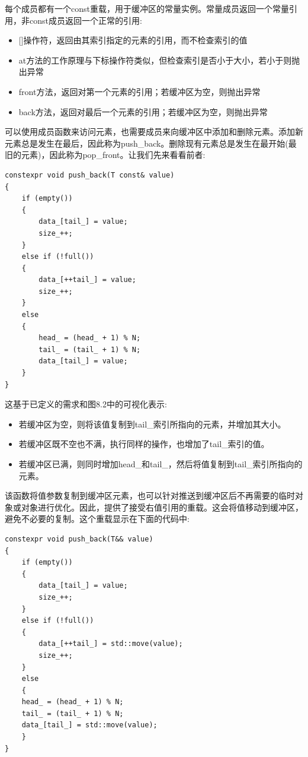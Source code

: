 每个成员都有一个const重载，用于缓冲区的常量实例。常量成员返回一个常量引用，非const成员返回一个正常的引用:

\begin{itemize}
\item
{}[]操作符，返回由其索引指定的元素的引用，而不检查索引的值

\item
at方法的工作原理与下标操作符类似，但检查索引是否小于大小，若小于则抛出异常

\item
front方法，返回对第一个元素的引用；若缓冲区为空，则抛出异常

\item
back方法，返回对最后一个元素的引用；若缓冲区为空，则抛出异常
\end{itemize}

可以使用成员函数来访问元素，也需要成员来向缓冲区中添加和删除元素。添加新元素总是发生在最后，因此称为push\_back。删除现有元素总是发生在最开始(最旧的元素)，因此称为pop\_front。让我们先来看看前者:

\begin{lstlisting}[style=styleCXX]
constexpr void push_back(T const& value)
{
	if (empty())
	{
		data_[tail_] = value;
		size_++;
	}
	else if (!full())
	{
		data_[++tail_] = value;
		size_++;
	}
	else
	{
		head_ = (head_ + 1) % N;
		tail_ = (tail_ + 1) % N;
		data_[tail_] = value;
	}
}
\end{lstlisting}

这基于已定义的需求和图8.2中的可视化表示:

\begin{itemize}
\item
若缓冲区为空，则将该值复制到tail\_索引所指向的元素，并增加其大小。

\item
若缓冲区既不空也不满，执行同样的操作，也增加了tail\_索引的值。

\item
若缓冲区已满，则同时增加head\_和tail\_，然后将值复制到tail\_索引所指向的元素。
\end{itemize}

该函数将值参数复制到缓冲区元素，也可以针对推送到缓冲区后不再需要的临时对象或对象进行优化。因此，提供了接受右值引用的重载。这会将值移动到缓冲区，避免不必要的复制。这个重载显示在下面的代码中:

\begin{lstlisting}[style=styleCXX]
constexpr void push_back(T&& value)
{
	if (empty())
	{
		data_[tail_] = value;
		size_++;
	}
	else if (!full())
	{
		data_[++tail_] = std::move(value);
		size_++;
	}
	else
	{
	head_ = (head_ + 1) % N;
	tail_ = (tail_ + 1) % N;
	data_[tail_] = std::move(value);
	}
}
\end{lstlisting}

